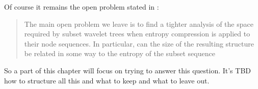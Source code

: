Of course it remains the open problem stated in \cite{SubsetWT}:
\begin{quote}
    The main open problem we leave is to find a tighter analysis of the space required by subset wavelet trees when entropy compression is applied to their node sequences. In particular, can the size of the resulting structure be related in some way to the entropy of the subset sequence
\end{quote}
So a part of this chapter will focus on trying to answer this question. It's TBD how to structure all this and what to keep and what to leave out.
